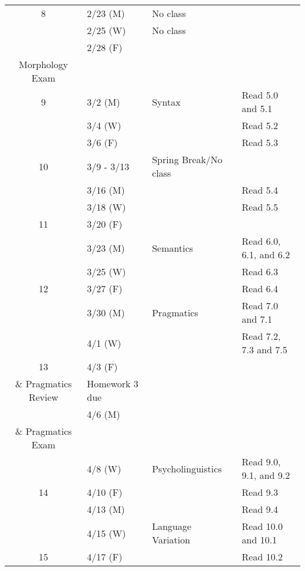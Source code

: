 \documentclass{article}
\makeatletter
\newcommand{\cellbreak}[2]{
    \begin{tabular}[t]{@{}l@{}}
      #1\\
      #2
    \end{tabular}}
\makeatother
\begin{document}
\begin{longtable}{c l l l}
      8     & 2/23 (M)    & No class                        & \\
            & 2/25 (W)    & No class                        & \\
            & 2/28 (F)    & \cellbreak{Phonology \&}
                                      {Morphology Exam}     & \\
      9     & 3/2 (M)     & Syntax                          & Read 5.0 and 5.1\\
            & 3/4 (W)     &                                 & Read 5.2\\
            & 3/6 (F)     &                                 & Read 5.3\\
      10    & 3/9 - 3/13  & Spring Break/No class           & \\
            & 3/16 (M)    &                                 & Read 5.4\\
            & 3/18 (W)    &                                 & Read 5.5\\
      11    & 3/20 (F)    &                                 & \\
            & 3/23 (M)    & Semantics                       & Read 6.0, 6.1, and 6.2\\
            & 3/25 (W)    &                                 & Read 6.3\\
      12    & 3/27 (F)    &                                 & Read 6.4\\
            & 3/30 (M)    & Pragmatics                      & Read 7.0 and 7.1\\
            & 4/1 (W)     &                                 & Read 7.2, 7.3 and 7.5\\
      13    & 4/3 (F)     & \cellbreak{Syntax, Semantics}
                                      {\& Pragmatics Review}& Homework 3 due\\
            & 4/6 (M)     & \cellbreak{Syntax, Semantics}
                                      {\& Pragmatics Exam}  & \\
            & 4/8 (W)     & Psycholinguistics               & Read 9.0, 9.1, and 9.2\\
      14    & 4/10 (F)    &                                 & Read 9.3\\
            & 4/13 (M)    &                                 & Read 9.4\\
            & 4/15 (W)    & Language Variation              & Read 10.0 and 10.1\\
      15    & 4/17 (F)    &                                 & Read 10.2\\

\end{longtable}
\end{document}
